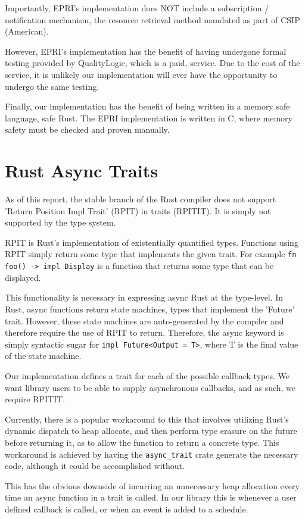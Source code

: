 Importantly, EPRI's implementation does NOT include a subscription / notification mechanism, the resource retrieval method mandated as part of CSIP (American). \cite{20305workshop}

However, EPRI's implementation has the benefit of having undergone formal testing provided by QualityLogic, which is a paid, service. Due to the cost of the service, it is unlikely our implementation will ever have the opportunity to undergo the same testing.

Finally, our implementation has the benefit of being written in a memory safe language, safe Rust. The EPRI implementation is written in C, where memory safety must be checked and proven manually. 

\section{Rust Async Traits}
As of this report, the stable branch of the Rust compiler does not support 'Return Position Impl Trait' (RPIT) in traits (RPITIT). It is simply not supported by the type system. \cite{rustRPITIT}

RPIT is Rust's implementation of existentially quantified types. Functions using RPIT simply return some type that implements the given trait. For example \texttt{fn foo() -> impl Display} is a function that returns some type that can be displayed.

This functionality is necessary in expressing async Rust at the type-level. In Rust, async functions return state machines, types that implement the 'Future' trait. However, these state machines are auto-generated by the compiler and therefore require the use of RPIT to return. Therefore, the async keyword is simply syntactic sugar for \texttt{impl Future<Output = T>}, where T is the final value of the state machine.

Our implementation defines a trait for each of the possible callback types. We want library users to be able to supply asynchronous callbacks, and as such, we require RPITIT.

Currently, there is a popular workaround to this that involves utilizing Rust's dynamic dispatch to heap allocate, and then perform type erasure on the future before returning it, as to allow the function to return a concrete type. This workaround is achieved by having the \texttt{async\_trait} crate generate the necessary code, although it could be accomplished without. \cite{asynctrait}

This has the obvious downside of incurring an unnecessary heap allocation every time an async function in a trait is called. In our library this is whenever a user defined callback is called, or when an event is added to a schedule.

